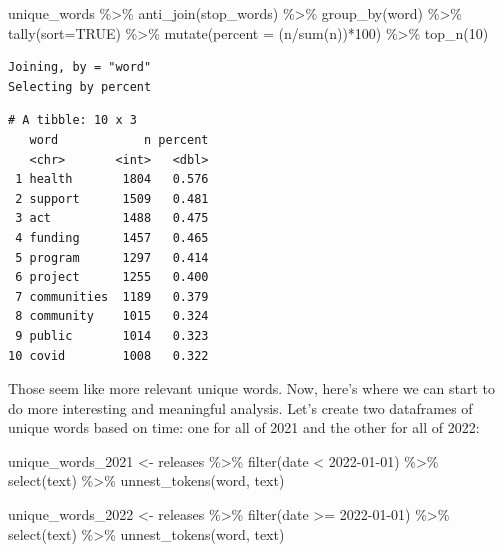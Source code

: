\documentclass[
  letterpaper,
  DIV=11,
  numbers=noendperiod]{scrreprt}
\newenvironment{Shaded}{\begin{snugshade}}{\end{snugshade}}
\newcommand{\AttributeTok}[1]{\textcolor[rgb]{0.40,0.45,0.13}{#1}}
\newcommand{\ConstantTok}[1]{\textcolor[rgb]{0.56,0.35,0.01}{#1}}
\newcommand{\DecValTok}[1]{\textcolor[rgb]{0.68,0.00,0.00}{#1}}
\newcommand{\FunctionTok}[1]{\textcolor[rgb]{0.28,0.35,0.67}{#1}}
\newcommand{\NormalTok}[1]{\textcolor[rgb]{0.00,0.23,0.31}{#1}}
\newcommand{\OtherTok}[1]{\textcolor[rgb]{0.00,0.23,0.31}{#1}}
\newcommand{\SpecialCharTok}[1]{\textcolor[rgb]{0.37,0.37,0.37}{#1}}
\newcommand{\StringTok}[1]{\textcolor[rgb]{0.13,0.47,0.30}{#1}}
\begin{document}
\begin{Shaded}
\begin{Highlighting}[]
\NormalTok{unique\_words }\SpecialCharTok{\%\textgreater{}\%}
  \FunctionTok{anti\_join}\NormalTok{(stop\_words) }\SpecialCharTok{\%\textgreater{}\%}
  \FunctionTok{group\_by}\NormalTok{(word) }\SpecialCharTok{\%\textgreater{}\%}
  \FunctionTok{tally}\NormalTok{(}\AttributeTok{sort=}\ConstantTok{TRUE}\NormalTok{) }\SpecialCharTok{\%\textgreater{}\%}
  \FunctionTok{mutate}\NormalTok{(}\AttributeTok{percent =}\NormalTok{ (n}\SpecialCharTok{/}\FunctionTok{sum}\NormalTok{(n))}\SpecialCharTok{*}\DecValTok{100}\NormalTok{) }\SpecialCharTok{\%\textgreater{}\%}
  \FunctionTok{top\_n}\NormalTok{(}\DecValTok{10}\NormalTok{)}
\end{Highlighting}
\end{Shaded}

\begin{verbatim}
Joining, by = "word"
Selecting by percent
\end{verbatim}

\begin{verbatim}
# A tibble: 10 x 3
   word            n percent
   <chr>       <int>   <dbl>
 1 health       1804   0.576
 2 support      1509   0.481
 3 act          1488   0.475
 4 funding      1457   0.465
 5 program      1297   0.414
 6 project      1255   0.400
 7 communities  1189   0.379
 8 community    1015   0.324
 9 public       1014   0.323
10 covid        1008   0.322
\end{verbatim}

Those seem like more relevant unique words. Now, here's where we can
start to do more interesting and meaningful analysis. Let's create two
dataframes of unique words based on time: one for all of 2021 and the
other for all of 2022:

\begin{Shaded}
\begin{Highlighting}[]
\NormalTok{unique\_words\_2021 }\OtherTok{\textless{}{-}}\NormalTok{ releases }\SpecialCharTok{\%\textgreater{}\%}
  \FunctionTok{filter}\NormalTok{(date }\SpecialCharTok{\textless{}} \StringTok{\textquotesingle{}2022{-}01{-}01\textquotesingle{}}\NormalTok{) }\SpecialCharTok{\%\textgreater{}\%}
  \FunctionTok{select}\NormalTok{(text) }\SpecialCharTok{\%\textgreater{}\%}
  \FunctionTok{unnest\_tokens}\NormalTok{(word, text)}

\NormalTok{unique\_words\_2022 }\OtherTok{\textless{}{-}}\NormalTok{ releases }\SpecialCharTok{\%\textgreater{}\%}
  \FunctionTok{filter}\NormalTok{(date }\SpecialCharTok{\textgreater{}=} \StringTok{\textquotesingle{}2022{-}01{-}01\textquotesingle{}}\NormalTok{) }\SpecialCharTok{\%\textgreater{}\%}
  \FunctionTok{select}\NormalTok{(text) }\SpecialCharTok{\%\textgreater{}\%}
  \FunctionTok{unnest\_tokens}\NormalTok{(word, text)}
\end{Highlighting}
\end{Shaded}
\end{document}
